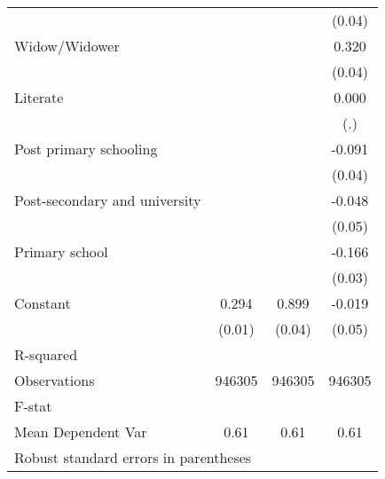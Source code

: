 {\begin{tabular}{l*{3}{c}}
                    &                     &                     &      (0.04)         \\
Widow/Widower       &                     &                     &       0.320\sym{***}\\
                    &                     &                     &      (0.04)         \\
Literate            &                     &                     &       0.000         \\
                    &                     &                     &         (.)         \\
Post primary schooling&                     &                     &      -0.091\sym{**} \\
                    &                     &                     &      (0.04)         \\
Post-secondary and university&                     &                     &      -0.048         \\
                    &                     &                     &      (0.05)         \\
Primary school      &                     &                     &      -0.166\sym{***}\\
                    &                     &                     &      (0.03)         \\
Constant            &       0.294\sym{***}&       0.899\sym{***}&      -0.019         \\
                    &      (0.01)         &      (0.04)         &      (0.05)         \\
\hline
R-squared           &                     &                     &                     \\
Observations        &      946305         &      946305         &      946305         \\
F-stat              &                     &                     &                     \\
Mean Dependent Var  &        0.61         &        0.61         &        0.61         \\
\hline\hline
\multicolumn{4}{l}{\footnotesize Robust standard errors in parentheses}\\
\end{tabular}
}

